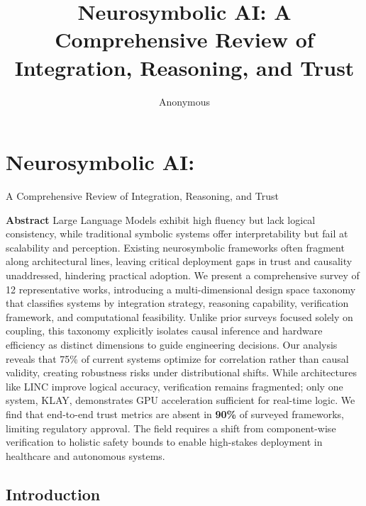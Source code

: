 \documentclass{article}
\title{Neurosymbolic AI: A Comprehensive Review of Integration, Reasoning, and Trust}
\author{Anonymous}
\begin{document}
\begin{abstract}

\end{abstract}

\maketitle

\section{Neurosymbolic AI:}

\label{sec:neurosymbolic_ai}

A Comprehensive Review of Integration, Reasoning, and Trust

\textbf{Abstract}
Large Language Models exhibit high fluency but lack logical consistency, while traditional symbolic systems offer interpretability but fail at scalability and perception. Existing neurosymbolic frameworks often fragment along architectural lines, leaving critical deployment gaps in trust and causality unaddressed, hindering practical adoption. We present a comprehensive survey of 12 representative works, introducing a multi-dimensional design space taxonomy that classifies systems by integration strategy, reasoning capability, verification framework, and computational feasibility. Unlike prior surveys focused solely on coupling, this taxonomy explicitly isolates causal inference and hardware efficiency as distinct dimensions to guide engineering decisions. Our analysis reveals that 75\% of current systems optimize for correlation rather than causal validity, creating robustness risks under distributional shifts. While architectures like LINC improve logical accuracy, verification remains fragmented; only one system, KLAY, demonstrates GPU acceleration sufficient for real-time logic. We find that end-to-end trust metrics are absent in \textbf{90\%} of surveyed frameworks, limiting regulatory approval. The field requires a shift from component-wise verification to holistic safety bounds to enable high-stakes deployment in healthcare and autonomous systems.

\subsection{Introduction}

\label{sec:introduction}
\end{document}
